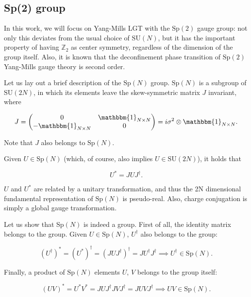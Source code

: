 \documentclass[reqno,12pt]{article}
\numberwithin{equation}{section}
\newcommand{\SU}{\mathrm{SU}}
\newcommand{\Sp}{\mathrm{Sp}}
\newcommand{\id}{\mathbbm{1}}
\begin{document}
\subsection{Sp(2) group} \label{sp2}

In this work, we will focus on Yang-Mills LGT with the $\Sp(2)$ gauge group: not only this deviates from the usual choice of $\SU(N)$, but
it has the important property of having $\mathbb{Z}_2$ as center symmetry, regardless of the dimension of the group itself. Also,
it is known that the deconfinement phase transition of $\Sp(2)$ Yang-Mills gauge theory is second order. 

Let us lay out a brief description of the $\Sp(N)$ group. $\Sp(N)$ is a subgroup of $\SU(2N)$, in which its elements leave the skew-symmetric
matrix $J$ invariant, where

\begin{equation}
	J = \mqty(0 & \id_{N \times N} \\ -\id_{N \times N} & 0) = i\sigma^2 \otimes \id_{N \times N}.
\end{equation}

Note that $J$ also belongs to $\Sp(N)$.

Given $U \in \Sp(N)$ (which, of course, also implies $U \in \SU(2N)$), it holds that

\begin{equation}
	U^* = J U J^\dagger.
\end{equation}

$U$ and $U^*$ are related by a unitary transformation, and thus the 2N dimensional fundamental representation of $\Sp(N)$ is pseudo-real.
Also, charge conjugation is simply a global gauge transformation.

Let us show that $\Sp(N)$ is indeed a group. First of all, the identity matrix belongs to the group. Given $U \in \Sp(N)$, $U^\dagger$ also
belongs to the group:

\begin{equation}
	(U^\dagger)^* = (U^*)^\dagger = (J U J^\dagger)^\dagger = J U^\dagger J^\dagger \implies U^\dagger \in \Sp(N).
\end{equation}

Finally, a product of $\Sp(N)$ elements $U$, $V$ belongs to the group itself:

\begin{equation}
	(U V)^* = U^* V^* = J U J^\dagger J V J^\dagger = J U V J^\dagger \implies UV \in \Sp(N).
\end{equation}
\end{document}
